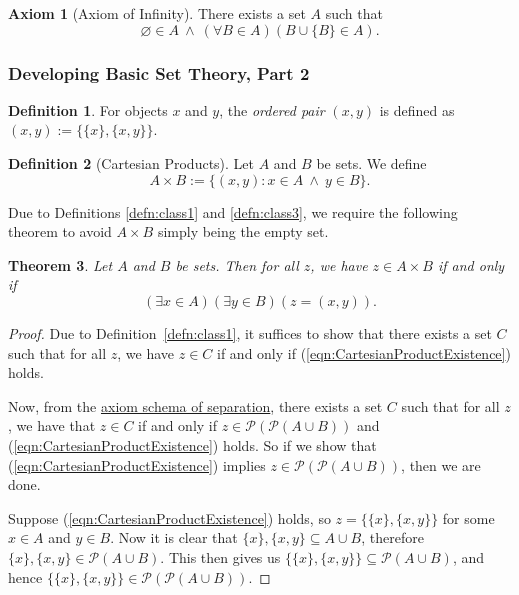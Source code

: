 \documentclass[a4paper,11pt]{article}
\theoremstyle{plain}
\newtheorem{thm}{Theorem}[subsection]
\theoremstyle{definition}
\newtheorem{defn}[thm]{Definition}
\newtheorem{axiom}{Axiom}
\theoremstyle{remark}
\begin{document}
\begin{axiom}[Axiom of Infinity]
\label{axiom:infinity}
There exists a set $A$ such that
\[\varnothing \in A \ \land \ (\forall B\in A)(B \cup \{B\} \in A).\]
\end{axiom}

\subsubsection{Developing Basic Set Theory, Part 2}
\label{subsubsec:SetTheoryPart2}
\begin{defn}
For objects $x$ and $y$, the \textit{ordered pair} $(x, y)$ is defined as $(x, y) := \{\{x\}, \{x, y\}\}$.
\end{defn}

\begin{defn}[Cartesian Products]
Let $A$ and $B$ be sets. We define 
\[A \times B := \{(x, y) : x\in A \ \land \ y \in B\}.\]
\end{defn}
Due to Definitions \ref{defn:class1} and \ref{defn:class3}, we require the following theorem to avoid $A\times B$ simply being the empty set.

\begin{thm}
\label{thm:CartesianProductExistence}
Let $A$ and $B$ be sets. Then for all $z$, we have $z \in A\times B$ if and only if
\begin{equation}
\label{eqn:CartesianProductExistence}
(\exists x \in A)(\exists y \in B)(z = (x, y)).
\end{equation}
\end{thm}
\begin{proof}
Due to Definition~\ref{defn:class1}, it suffices to show that there exists a set $C$ such that for all $z$, we have $z \in C$ if and only if (\ref{eqn:CartesianProductExistence}) holds.

Now, from the \hyperref[axiom:separation]{axiom schema of separation}, there exists a set $C$ such that for all $z$, we have that $z \in C$ if and only if $z \in \mathscr P(\mathscr P (A \cup B))$ and (\ref{eqn:CartesianProductExistence}) holds. So if we show that (\ref{eqn:CartesianProductExistence}) implies $z \in \mathscr P(\mathscr P (A \cup B))$, then we are done.

Suppose (\ref{eqn:CartesianProductExistence}) holds, so $z = \{\{x\}, \{x, y\}\}$ for some $x \in A$ and $y \in B$. Now it is clear that $\{x\}, \{x, y\} \subseteq A \cup B$, therefore $\{x\}, \{x, y\} \in \mathscr P(A \cup B)$. This then gives us $\{\{x\}, \{x,y\}\} \subseteq \mathscr P(A\cup B)$, and hence $\{\{x\}, \{x,y\}\} \in \mathscr P (\mathscr P (A \cup B))$.
\end{proof}
\end{document}
